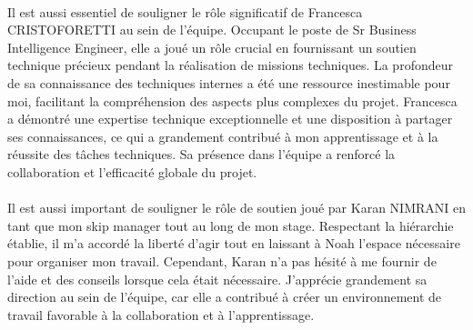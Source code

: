 \paragraph{}
\vspace{-2em}
Il est aussi essentiel de souligner le rôle significatif de Francesca \MakeUppercase{Cristoforetti} au sein de l'équipe. Occupant le poste de Sr Business Intelligence Engineer, elle a joué un rôle crucial en fournissant un soutien technique précieux pendant la réalisation de missions techniques. La profondeur de sa connaissance des techniques internes a été une ressource inestimable pour moi, facilitant la compréhension des aspects plus complexes du projet. Francesca a démontré une expertise technique exceptionnelle et une disposition à partager ses connaissances, ce qui a grandement contribué à mon apprentissage et à la réussite des tâches techniques. Sa présence dans l'équipe a renforcé la collaboration et l'efficacité globale du projet.

\paragraph{}
\vspace{-2em}

Il est aussi important de souligner le rôle de soutien joué par Karan \MakeUppercase{Nimrani} en tant que mon skip manager tout au long de mon stage. Respectant la hiérarchie établie, il m'a accordé la liberté d'agir tout en laissant à Noah l'espace nécessaire pour organiser mon travail. Cependant, Karan n'a pas hésité à me fournir de l'aide et des conseils lorsque cela était nécessaire. J'apprécie grandement sa direction au sein de l'équipe, car elle a contribué à créer un environnement de travail favorable à la collaboration et à l'apprentissage. 